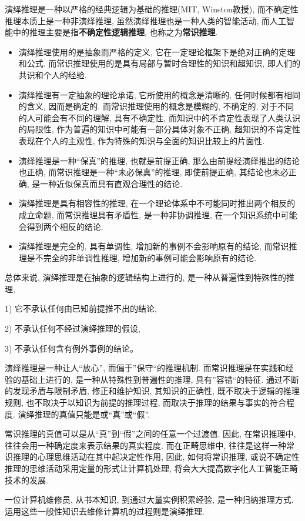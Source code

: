 演绎推理是一种以严格的经典逻辑为基础的推理(MIT, Winston教授), 而不确定性推理本质上是一种非演绎推理, 虽然演绎推理也是一种人类的智能活动, 而人工智能中的推理主要是指\textbf{不确定性逻辑推理}, 也称之为\textbf{常识推理}.
\begin{itemize}
\item 演绎推理使用的是抽象而严格的定义, 它在一定理论框架下是绝对正确的定理和公式. 而常识推理使用的是具有局部与暂时合理性的知识和超知识, 即人们的共识和个人的经验.
\item 演绎推理有一定抽象的理论承诺, 它所使用的概念是清晰的, 任何时候都有相同的含义, 因而是确定的. 而常识推理使用的概念是模糊的, 不确定的, 对于不同的人可能会有不同的理解, 具有不确定性, 而知识中的不肯定性表现了人类认识的局限性, 作为普遍的知识中可能有一部分具体对象不正确, 超知识的不肯定性表现在个人的主观性, 作为特殊的知识与全面的知识比较上的片面性.
\item 演绎推理是一种“保真”的推理, 也就是前提正确, 那么由前提经演绎推出的结论也正确, 而常识推理是一种“未必保真”的推理, 即使前提正确, 其结论也未必正确, 是一种近似保真而具有直观合理性的结论.
\item 演绎推理是具有相容性的推理, 在一个理论体系中不可能同时推出两个相反的成立命题, 而常识推理具有矛盾性, 是一种非协调推理, 在一个知识系统中可能会得到两个相反的结论.
\item 演绎推理是完全的, 具有单调性, 增加新的事例不会影响原有的结论, 而常识推理是不完全的非单调性推理, 增加新的事例可能会影响原有的结论.
\end{itemize}

总体来说, 演绎推理是在抽象的逻辑结构上进行的, 是一种从普遍性到特殊性的推理,

1) 它不承认任何由已知前提推不出的结论,

2) 不承认任何不经过演绎推理的假设,

3) 不承认任何含有例外事例的结论。

演绎推理是一种让人“放心”, 而偏于”保守“的推理机制. 而常识推理是在实践和经验的基础上进行的, 是一种从特殊性到普遍性的推理, 具有”容错“的特征.
通过不断的发现矛盾与限制矛盾, 修正和维护知识, 其知识的正确性, 既不取决于逻辑的推理规则, 也不取决于以知识为前提的推理过程, 而取决于推理的结果与事实的符合程度.
演绎推理的真值只能是或“真”或“假”.

常识推理的真值可以是从“真”到“假”之间的任意一个过渡值. 因此, 在常识推理中, 往往会用一种确定度来表示结果的真实程度.
而在正畸思维中, 往往是这样一种常识推理的心理思维活动在其中起决定性作用, 因此, 如何将常识推理, 或说不确定性推理的思维活动采用定量的形式让计算机处理, 将会大大提高数字化人工智能正畸技术的发展.
\begin{example}
  一位计算机维修员, 从书本知识, 到通过大量实例积累经验, 是一种归纳推理方式. 运用这些一般性知识去维修计算机的过程则是演绎推理.
\end{example}
